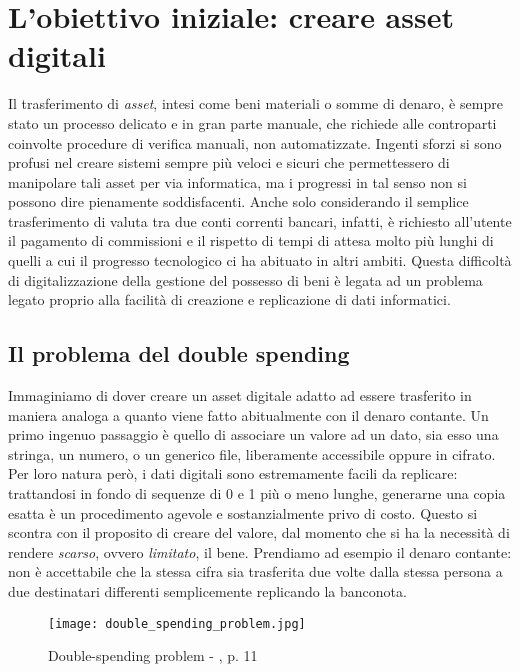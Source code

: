 \section{L'obiettivo iniziale: creare asset digitali}
	Il trasferimento di \emph{asset}, intesi come beni materiali o somme di denaro, è sempre stato un processo delicato e in gran parte manuale, che richiede alle controparti coinvolte procedure di verifica manuali, non automatizzate. Ingenti sforzi si sono profusi nel creare sistemi sempre più veloci e sicuri che permettessero di manipolare tali asset per via informatica, ma i progressi in tal senso non si possono dire pienamente soddisfacenti. Anche solo considerando il semplice trasferimento di valuta tra due conti correnti bancari, infatti, è richiesto all'utente il pagamento di commissioni e il rispetto di tempi di attesa molto più lunghi di quelli a cui il progresso tecnologico ci ha abituato in altri ambiti. Questa difficoltà di digitalizzazione della gestione del possesso di beni è legata ad un problema legato proprio alla facilità di creazione e replicazione di dati informatici.
	\subsection{Il problema del double spending}
		Immaginiamo di dover creare un asset digitale adatto ad essere trasferito in maniera analoga a quanto viene fatto abitualmente con il denaro contante. Un primo ingenuo passaggio è quello di associare un valore ad un dato, sia esso una stringa, un numero, o un generico file, liberamente accessibile oppure in cifrato. Per loro natura però, i dati digitali sono estremamente facili da replicare: trattandosi in fondo di sequenze di 0 e 1 più o meno lunghe, generarne una copia esatta è un procedimento agevole e sostanzialmente privo di costo. Questo si scontra con il proposito di creare del valore, dal momento che si ha la necessità di rendere \emph{scarso}, ovvero \emph{limitato}, il bene. Prendiamo ad esempio il denaro contante: non è accettabile che la stessa cifra sia trasferita due volte dalla stessa persona a due destinatari differenti semplicemente replicando la banconota.
		\begin{figure}[ht]
			\centering
			\texttt{[image: double\_spending\_problem.jpg]}
			\caption[Double-spending problem]{Double-spending problem - \cite{understanding_bitcoin}, p. 11}
			\label{fig:double-spending_img}
		\end{figure}

